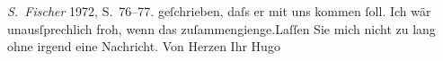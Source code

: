 \begin{ledgroupsized}[t]{13cm}
{{{                        \emph{S. Fischer}{ }1972, S. 76–77.}}}\label{K_L00818-1h} geſchrieben, daſs er mit uns kommen
               ſoll. Ich wär unausſprechlich froh, wenn das zuſammengienge.\hspace*{2.5em}Laſſen Sie mich nicht zu lang ohne irgend eine Nachricht. Von {\pb}Herzen Ihr\pend
           \pstart \spacefill\mbox{Hugo}\pend{}
         
         \endnumbering{}\end{ledgroupsized}  \newcommand{\dateiname}{L00818}\newcommand{\titel}{Hugo von Hofmannsthal an Arthur Schnitzler, 12. 7. [1898]}\newcommand{\editorInnen}{Martin Anton Müller und Gerd-Hermann Susen}
      